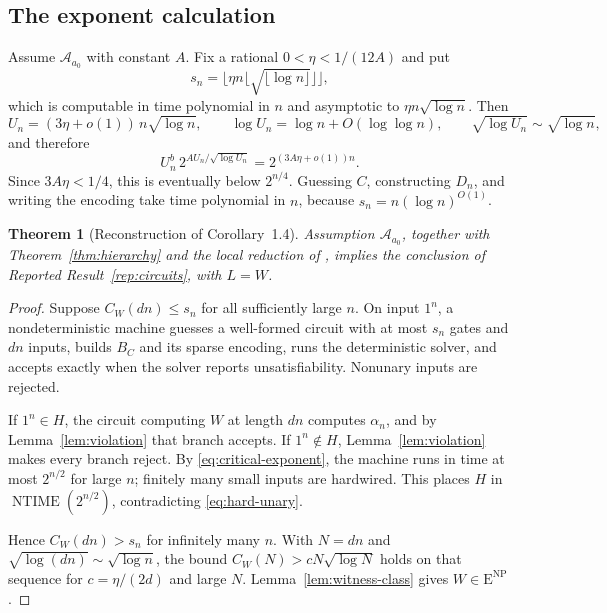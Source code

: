 \documentclass[11pt,reqno]{amsart}
\numberwithin{equation}{section}
\theoremstyle{plain}
\newtheorem{theorem}{Theorem}[section]
\theoremstyle{definition}
\theoremstyle{remark}
\newcommand{\ENP}{\mathrm E^{\mathrm{NP}}}
\newcommand{\NTIME}{\operatorname{NTIME}}
\begin{document}
\subsection{The exponent calculation}
Assume $\mathcal A_{a_0}$ with constant $A$. Fix a rational
$0<\eta<1/(12A)$ and put
\begin{equation}\label{eq:threshold}
 s_n=\bigl\lfloor\eta n\lfloor\sqrt{\lfloor\log n\rfloor}\rfloor\bigr\rfloor,
\end{equation}
which is computable in time polynomial in $n$ and asymptotic to
$\eta n\sqrt{\log n}$. Then
\[
 U_n=(3\eta+o(1))\,n\sqrt{\log n},\qquad \log U_n=\log n+O(\log\log n),
 \qquad \sqrt{\log U_n}\sim\sqrt{\log n},
\]
and therefore
\begin{equation}\label{eq:critical-exponent}
 U_n^b\,2^{AU_n/\sqrt{\log U_n}}=2^{(3A\eta+o(1))n}.
\end{equation}
Since $3A\eta<1/4$, this is eventually below $2^{n/4}$. Guessing $C$,
constructing $D_n$, and writing the encoding take time polynomial in $n$,
because $s_n=n(\log n)^{O(1)}$.

\begin{theorem}[Reconstruction of Corollary~1.4]\label{thm:main}
Assumption $\mathcal A_{a_0}$, together with Theorem~\ref{thm:hierarchy} and
the local reduction of \cite{JMV}, implies the conclusion of Reported
Result~\ref{rep:circuits}, with $L=W$.
\end{theorem}
\begin{proof}
Suppose $C_W(dn)\le s_n$ for all sufficiently large $n$. On input $1^n$, a
nondeterministic machine guesses a well-formed circuit with at most $s_n$
gates and $dn$ inputs, builds $B_C$ and its sparse encoding, runs the
deterministic solver, and accepts exactly when the solver reports
unsatisfiability. Nonunary inputs are rejected.

If $1^n\in H$, the circuit computing $W$ at length $dn$ computes
$\alpha_n$, and by Lemma~\ref{lem:violation} that branch accepts. If
$1^n\notin H$, Lemma~\ref{lem:violation} makes every branch reject. By
\eqref{eq:critical-exponent}, the machine runs in time at most $2^{n/2}$ for
large $n$; finitely many small inputs are hardwired. This places $H$ in
$\NTIME(2^{n/2})$, contradicting \eqref{eq:hard-unary}.

Hence $C_W(dn)>s_n$ for infinitely many $n$. With $N=dn$ and
$\sqrt{\log(dn)}\sim\sqrt{\log n}$, the bound $C_W(N)>cN\sqrt{\log N}$ holds
on that sequence for $c=\eta/(2d)$ and large $N$. Lemma~\ref{lem:witness-class}
gives $W\in\ENP$.
\end{proof}
\end{document}
